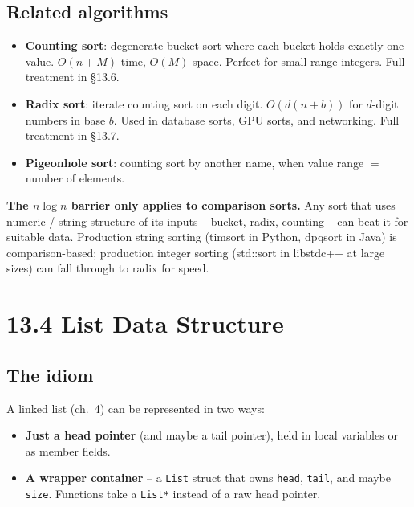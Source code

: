 \documentclass[11pt]{article}
\begin{document}
\subsection*{Related algorithms}

\begin{itemize}[leftmargin=*]
    \item \textbf{Counting sort}: degenerate bucket sort where each bucket holds exactly one value. $O(n + M)$ time, $O(M)$ space. Perfect for small-range integers. Full treatment in \S13.6.
    \item \textbf{Radix sort}: iterate counting sort on each digit. $O(d(n + b))$ for $d$-digit numbers in base $b$. Used in database sorts, GPU sorts, and networking. Full treatment in \S13.7.
    \item \textbf{Pigeonhole sort}: counting sort by another name, when value range $=$ number of elements.
\end{itemize}

\begin{ideabox}
\textbf{The $n \log n$ barrier only applies to comparison sorts.} Any sort that uses numeric / string structure of its inputs -- bucket, radix, counting -- can beat it for suitable data. Production string sorting (timsort in Python, dpqsort in Java) is comparison-based; production integer sorting (std::sort in libstdc++ at large sizes) can fall through to radix for speed.
\end{ideabox}

\section{13.4 List Data Structure}

\subsection*{The idiom}

A linked list (ch.~4) can be represented in two ways:

\begin{itemize}[leftmargin=*]
    \item \textbf{Just a head pointer} (and maybe a tail pointer), held in local variables or as member fields.
    \item \textbf{A wrapper container} -- a \texttt{List} struct that owns \texttt{head}, \texttt{tail}, and maybe \texttt{size}. Functions take a \texttt{List*} instead of a raw head pointer.
\end{itemize}
\end{document}

